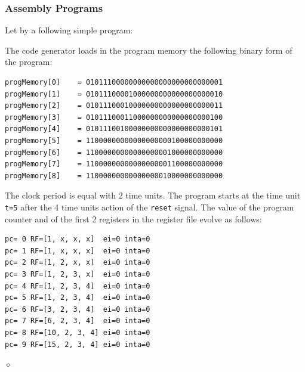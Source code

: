 \subsubsection{Assembly Programs}

\begin{exemplu}\label{exADD}
Let by a following simple program:
{\em 
{}
}

The code generator loads in the program memory the following binary form of the program:
{\small
\begin{verbatim}
progMemory[0] 	 = 01011100000000000000000000000001
progMemory[1] 	 = 01011100001000000000000000000010
progMemory[2] 	 = 01011100010000000000000000000011
progMemory[3] 	 = 01011100011000000000000000000100
progMemory[4] 	 = 01011100100000000000000000000101
progMemory[5] 	 = 11000000000000000000100000000000
progMemory[6] 	 = 11000000000000000001000000000000
progMemory[7] 	 = 11000000000000000001100000000000
progMemory[8] 	 = 11000000000000000010000000000000
\end{verbatim}
}
The clock period is equal with 2 time units. The program starts at the time unit {\tt t=5} after the 4 time units action of the {\tt reset} signal.
The value of the program counter and of the first 2 registers in the register file evolve as follows:
{\small
\begin{verbatim}
pc= 0 RF=[1, x, x, x]  ei=0 inta=0
pc= 1 RF=[1, x, x, x]  ei=0 inta=0
pc= 2 RF=[1, 2, x, x]  ei=0 inta=0
pc= 3 RF=[1, 2, 3, x]  ei=0 inta=0
pc= 4 RF=[1, 2, 3, 4]  ei=0 inta=0
pc= 5 RF=[1, 2, 3, 4]  ei=0 inta=0
pc= 6 RF=[3, 2, 3, 4]  ei=0 inta=0
pc= 7 RF=[6, 2, 3, 4]  ei=0 inta=0
pc= 8 RF=[10, 2, 3, 4] ei=0 inta=0
pc= 9 RF=[15, 2, 3, 4] ei=0 inta=0
\end{verbatim}
}

$\diamond$
\end{exemplu}


